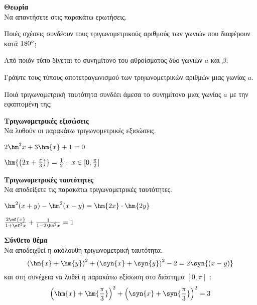 \documentclass[ektypwsh]{diag-xelatex}
\begin{document}
\askhseis
\begin{thema}
\item \textbf{Θεωρία}\\
Να απαντήσετε στις παρακάτω ερωτήσεις.
\begin{rlist}
\item Ποιές σχέσεις συνδέουν τους τριγωνομετρικούς αριθμούς των γωνιών που διαφέρουν κατά $ 180\degree $;
\item Από ποιόν τύπο δίνεται το συνημίτονο του αθροίσματος δύο γωνιών $ a $ και $ \beta $;
\item Γράψτε τους τύπους αποτετραγωνισμού των τριγωνομετρικών αριθμών μιας γωνίας $ a $.
\item Ποιά τριγωνομετρική ταυτότητα συνδέει άμεσα το συνημίτονο μιας γωνίας $ a $ με την εφαπτομένη της;
\end{rlist}
\item \textbf{Τριγωνομετρικές εξισώσεις}\\
Να λυθούν οι παρακάτω τριγωνομετρικές εξισώσεις.
\begin{rlist}
\item $ 2\hm^2{x}+3\hm{x}+1=0 $
\item $ \hm{\left( 2x+\frac{\pi}{3}\right) }=\frac{1}{2}\ ,\ x\in[0,\frac{\pi}{2}] $
\end{rlist}
\item \textbf{Τριγωνομετρικές ταυτότητες}\\
Να αποδείξετε τις παρακάτω τριγωνομετρικές ταυτότητες.
\begin{rlist}
\item $ \hm^2{\left( x+y\right) }-\hm^2{(x-y)}=\hm{2x}\cdot\hm{2y} $
\item $ \frac{2\ef{x}}{1+\ef^2{x}}+\frac{1}{1-2\hm^2{x}}=1 $
\end{rlist}
\item \textbf{Σύνθετο θέμα}\\
Να αποδειχθεί η ακόλουθη τριγωνομετρική ταυτότητα.
\[ \left(\hm{x}+\hm{y}\right)^2+\left(\syn{x}+\syn{y}\right)^2-2=2\syn{(x-y)} \]
και στη συνέχεια να λυθεί η παρακάτω εξίσωση στο διάστημα $ [0,\pi] $ :
\[ \left(\hm{x}+\hm{\frac{\pi}{3}}\right)^2+\left(\syn{x}+\syn{\frac{\pi}{3}}\right)^2=3 \]
\end{thema}
\kaliepityxia
\end{document}
